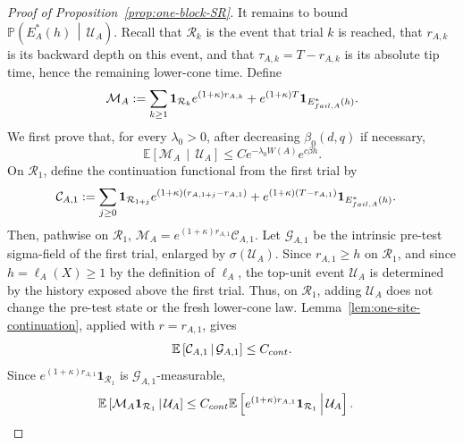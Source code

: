 \documentclass[10pt,a4paper]{amsart}
\begin{document}
\begin{proof}[Proof of Proposition~\ref{prop:one-block-SR}]
It remains to bound $\mathbb P\left(E_A^*(h)\,\middle|\,\mathcal U_A\right)$.
Recall that \(\mathcal R_k\) is the event that trial \(k\) is reached, that
\(r_{A,k}\) is its backward depth on this event, and that
\(\tau_{A,k}=T-r_{A,k}\) is its absolute tip time, hence the remaining
lower-cone time.
Define
\[
        \mathcal M_A
        :=
        \sum_{k\ge1}
        \mathbf 1_{\mathcal R_k}
        e^{(1+\kappa)r_{A,k}}
        +
        e^{(1+\kappa) T}
        \mathbf 1_{E_{{\rm fail},A}^*(h)} .
\]
We first prove that, for every \(\lambda_0>0\), after decreasing
\(\beta_0(d,q)\) if necessary,
\begin{equation}\label{eq:MA-bound}
        \mathbb E\left[
            \mathcal M_A
            \,\middle|\,
            \mathcal U_A
        \right]
        \le
        C e^{-\lambda_0W(A)}e^{c\beta h}.
\end{equation}
On \(\mathcal R_1\), define the continuation functional from the first trial by
\[
\begin{aligned}
        \mathcal C_{A,1}
        &:=
        \sum_{j\ge0}
        \mathbf 1_{\mathcal R_{1+j}}
        e^{(1+\kappa)(r_{A,1+j}-r_{A,1})}
        +
        e^{(1+\kappa)(T-r_{A,1})}
        \mathbf 1_{E_{{\rm fail},A}^*(h)} .
\end{aligned}
\]
Then, pathwise on \(\mathcal R_1\), $\mathcal M_A
        =
        e^{(1+\kappa)r_{A,1}}\mathcal C_{A,1}$.
Let \(\mathcal G_{A,1}\) be the intrinsic pre-test sigma-field of the first
trial, enlarged by \(\sigma(\mathcal U_A)\). Since \(r_{A,1}\ge h\) on
\(\mathcal R_1\), and since
\(h=\ell_A(X)\ge1\) by the definition of \(\ell_A\), the top-unit event
\(\mathcal U_A\) is determined by the history exposed above the first trial.
Thus, on \(\mathcal R_1\), adding \(\mathcal U_A\) does not change the
pre-test state or the fresh lower-cone law.
Lemma~\ref{lem:one-site-continuation}, applied with
\(r=r_{A,1}\), gives
\[
        \mathbb E\left[
            \mathcal C_{A,1}
            \,\middle|\,
            \mathcal G_{A,1}
        \right]
        \le C_{\rm cont}.
\]
Since
\(e^{(1+\kappa)r_{A,1}}\mathbf 1_{\mathcal R_1}\) is
\(\mathcal G_{A,1}\)-measurable,
\[
\begin{aligned}
        \mathbb E\left[
            \mathcal M_A\mathbf 1_{\mathcal R_1}
            \,\middle|\,
            \mathcal U_A
        \right]
        &\le
        C_{\rm cont}
        \mathbb E\left[
            e^{(1+\kappa)r_{A,1}}
            \mathbf 1_{\mathcal R_1}
            \,\middle|\,
            \mathcal U_A
        \right].
\end{aligned}
\]
\end{proof}
\end{document}
